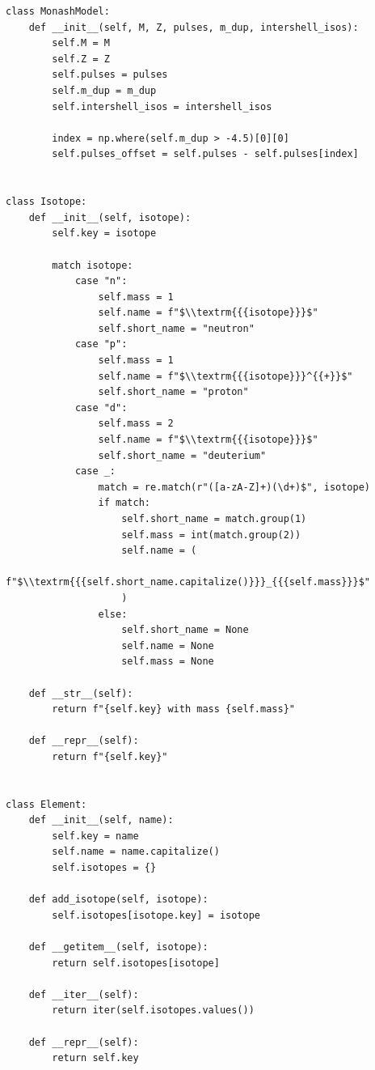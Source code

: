 \documentclass[a4paper,10pt]{article}
\begin{document}
\begin{verbatim}
class MonashModel:
    def __init__(self, M, Z, pulses, m_dup, intershell_isos):
        self.M = M
        self.Z = Z
        self.pulses = pulses
        self.m_dup = m_dup
        self.intershell_isos = intershell_isos

        index = np.where(self.m_dup > -4.5)[0][0]
        self.pulses_offset = self.pulses - self.pulses[index]


class Isotope:
    def __init__(self, isotope):
        self.key = isotope

        match isotope:
            case "n":
                self.mass = 1
                self.name = f"$\\textrm{{{isotope}}}$"
                self.short_name = "neutron"
            case "p":
                self.mass = 1
                self.name = f"$\\textrm{{{isotope}}}^{{+}}$"
                self.short_name = "proton"
            case "d":
                self.mass = 2
                self.name = f"$\\textrm{{{isotope}}}$"
                self.short_name = "deuterium"
            case _:
                match = re.match(r"([a-zA-Z]+)(\d+)$", isotope)
                if match:
                    self.short_name = match.group(1)
                    self.mass = int(match.group(2))
                    self.name = (
                        f"$\\textrm{{{self.short_name.capitalize()}}}_{{{self.mass}}}$"
                    )
                else:
                    self.short_name = None
                    self.name = None
                    self.mass = None

    def __str__(self):
        return f"{self.key} with mass {self.mass}"

    def __repr__(self):
        return f"{self.key}"


class Element:
    def __init__(self, name):
        self.key = name
        self.name = name.capitalize()
        self.isotopes = {}

    def add_isotope(self, isotope):
        self.isotopes[isotope.key] = isotope

    def __getitem__(self, isotope):
        return self.isotopes[isotope]

    def __iter__(self):
        return iter(self.isotopes.values())

    def __repr__(self):
        return self.key


\end{verbatim}
\end{document}

